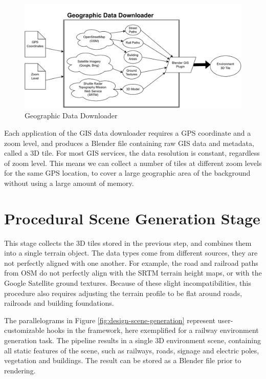 \begin{figure}[H]
    \centering
    \includegraphics[width=14.5cm]{src/img/fig/fig-2 Geographic Data Downloader.drawio.pdf}
    \caption{Geographic Data Downloader}

    \label{fig:design-data-downloader}
\end{figure}

Each application of the GIS data downloader requires a GPS coordinate and a zoom level, and produces a Blender file containing raw GIS data and metadata, called a 3D tile. For most GIS services, the data resolution is constant, regardless of zoom level. This means we can collect a number of tiles at different zoom levels for the same GPS location, to cover a large geographic area of the background without using a large amount of memory.


\section{Procedural Scene Generation Stage}
\label{sec:scene-generation-stage}

This stage collects the 3D tiles stored in the previous step, and combines them into a single terrain object. The data types come from different sources, they are not perfectly aligned with one another. For example, the road and railroad paths from OSM do not perfectly align with the SRTM terrain height maps, or with the Google Satellite ground textures. Because of these slight incompatibilities, this procedure also requires adjusting the terrain profile to be flat around roads, railroads and building foundations.

The parallelograms in Figure \ref{fig:design-scene-generation} represent user-customizable hooks in the framework, here exemplified for a  railway environment generation task. The pipeline results in a single 3D environment scene, containing all static features of the scene, such as railways, roads, signage and electric poles, vegetation and buildings. The result can be stored as a Blender file prior to rendering.

